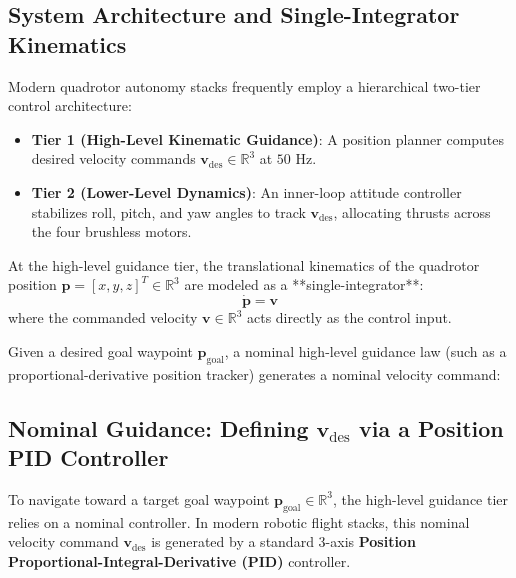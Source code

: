 \documentclass[11pt,a4paper]{article}
\begin{document}
\subsection{System Architecture and Single-Integrator Kinematics}
Modern quadrotor autonomy stacks frequently employ a hierarchical two-tier control architecture:
\begin{itemize}
    \item \textbf{Tier 1 (High-Level Kinematic Guidance)}: A position planner computes desired velocity commands $\mathbf{v}_{\mathrm{des}} \in \mathbb{R}^3$ at $50\text{ Hz}$.
    \item \textbf{Tier 2 (Lower-Level Dynamics)}: An inner-loop attitude controller stabilizes roll, pitch, and yaw angles to track $\mathbf{v}_{\mathrm{des}}$, allocating thrusts across the four brushless motors.
\end{itemize}
At the high-level guidance tier, the translational kinematics of the quadrotor position $\mathbf{p} = [x, y, z]^T \in \mathbb{R}^3$ are modeled as a **single-integrator**:
\begin{equation}
\mathbf{\dot{p}} = \mathbf{v}
\label{eq:single_integrator}
\end{equation}
where the commanded velocity $\mathbf{v} \in \mathbb{R}^3$ acts directly as the control input.

Given a desired goal waypoint $\mathbf{p}_{\mathrm{goal}}$, a nominal high-level guidance law (such as a proportional-derivative position tracker) generates a nominal velocity command:
\subsection{Nominal Guidance: Defining \texorpdfstring{$\mathbf{v}_{\mathrm{des}}$}{v\_des} via a Position PID Controller}
To navigate toward a target goal waypoint $\mathbf{p}_{\mathrm{goal}} \in \mathbb{R}^3$, the high-level guidance tier relies on a nominal controller. In modern robotic flight stacks, this nominal velocity command $\mathbf{v}_{\mathrm{des}}$ is generated by a standard 3-axis \textbf{Position Proportional-Integral-Derivative (PID)} controller.
\end{document}

